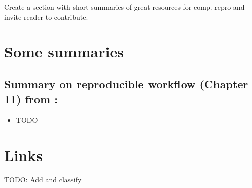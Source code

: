 \documentclass[]{book}
\providecommand{\tightlist}{%
  \setlength{\itemsep}{0pt}\setlength{\parskip}{0pt}}
\begin{document}
Create a section with short summaries of great resources for comp. repro and invite reader to contribute.

\hypertarget{some-summaries}{%
\section{Some summaries}\label{some-summaries}}

\hypertarget{summary-on-reproducible-workflow-chapter-11-from-christensen2019transparent}{%
\subsection{\texorpdfstring{Summary on reproducible workflow (Chapter 11) from \citet{christensen2019transparent}:}{Summary on reproducible workflow (Chapter 11) from @christensen2019transparent:}}\label{summary-on-reproducible-workflow-chapter-11-from-christensen2019transparent}}

\begin{itemize}
\tightlist
\item
  TODO
\end{itemize}

\hypertarget{links}{%
\section{Links}\label{links}}

TODO: Add and classify
\end{document}
